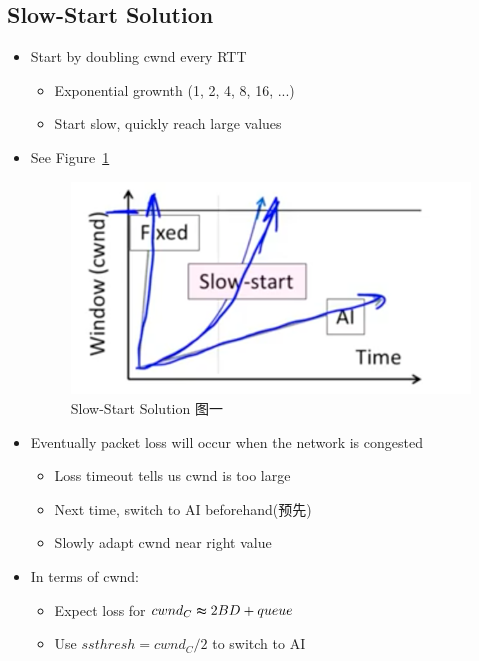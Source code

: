 \documentclass[12pt]{ctexart}   %
\begin{document}
	\subsection{Slow-Start Solution}
	\begin{itemize}
		\item Start by doubling cwnd every RTT
		\begin{itemize}
			\item Exponential grownth (1, 2, 4, 8, 16, ...)
			\item Start slow, quickly reach large values
		\end{itemize}
		\item See Figure~\ref{fig:7-6-2}
		  
		 \begin{figure}[h!] %
		\centering
		 \includegraphics[scale=0.7]{images/7-6-2}
		\caption{ Slow-Start Solution 图一 }
		 \label{fig:7-6-2}
		 \end{figure}	
		 
		 \item Eventually packet loss will occur when the network is congested
		 \begin{itemize}
		 	\item Loss timeout tells us cwnd is too large
		 	\item Next time, switch to AI beforehand(预先)
		 	\item Slowly adapt cwnd near right value
		 \end{itemize}
		 
		 \item In terms of cwnd:
		 \begin{itemize}
		 	\item Expect loss for $ cwnd_{C} \thickapprox 2BD + queue $
		 	\item Use $ssthresh = cwnd_{C}/2 $ to switch to AI
		 \end{itemize}
		 

\end{itemize}
\end{document}
